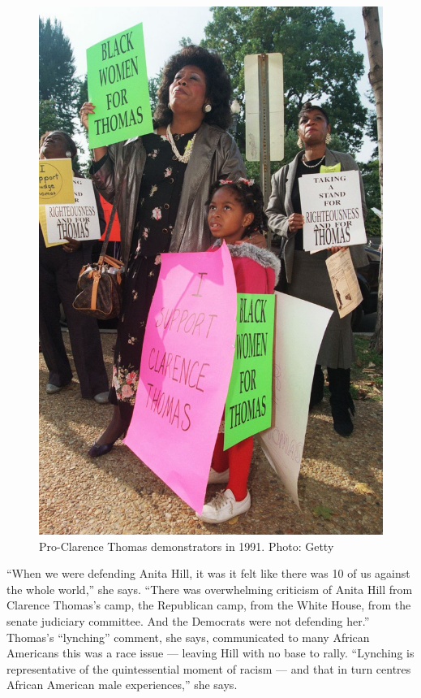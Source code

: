 \documentclass{article}
\begin{document}
\begin{figure}[h]
	\includegraphics{.resources/Getty91.jpg}
	\caption{Pro-Clarence Thomas demonstrators in 1991. Photo: Getty}
\end{figure}

``When we were defending Anita Hill, it was it felt like there was 10 of us
against the whole world,'' she says. ``There was overwhelming criticism of
Anita Hill from Clarence Thomas's camp, the Republican camp, from the White
House, from the senate judiciary committee. And the Democrats were not
defending her.'' Thomas's ``lynching'' comment, she says, communicated to many
African Americans this was a race issue --- leaving Hill with no base to rally.
``Lynching is representative of the quintessential moment of racism --- and
that in turn centres African American male experiences,'' she says.
\end{document}
